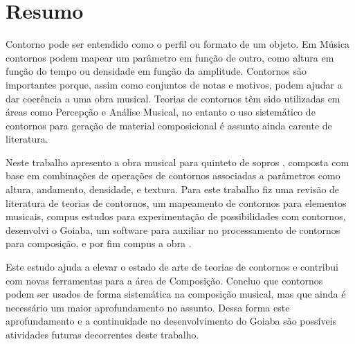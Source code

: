 \chapter*{Resumo}
\label{cha:resumo}

Contorno pode ser entendido como o perfil ou formato de um objeto. Em
Música contornos podem mapear um parâmetro em função de outro, como
altura em função do tempo ou densidade em função da
amplitude. Contornos são importantes porque, assim como conjuntos de
notas e motivos, podem ajudar a dar coerência a uma obra musical.
Teorias de contornos têm sido utilizadas em áreas como Percepção e
Análise Musical, no entanto o uso sistemático de contornos para
geração de material composicional é assunto ainda carente de
literatura.

Neste trabalho apresento a obra musical para quinteto de sopros
\obra{}, composta com base em combinações de operações de contornos
associadas a parâmetros como altura, andamento, densidade, e textura.
Para este trabalho fiz uma revisão de literatura de teorias de
contornos, um mapeamento de contornos para elementos musicais, compus
estudos para experimentação de possibilidades com contornos,
desenvolvi o Goiaba, um software para auxiliar no processamento de
contornos para composição, e por fim compus a obra \obra{}.

Este estudo ajuda a elevar o estado de arte de teorias de contornos e
contribui com novas ferramentas para a área de Composição.
Concluo que contornos podem ser usados de forma sistemática na
composição musical, mas que ainda é necessário um maior aprofundamento
no assunto. Dessa forma este aprofundamento e a continuidade no
desenvolvimento do Goiaba são possíveis atividades futuras decorrentes
deste trabalho.
